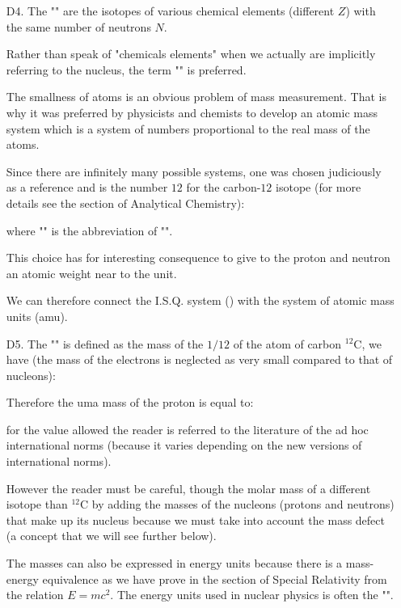 \begin{enumerate}
		\item[D4.] The "" are the isotopes of various chemical elements (different $Z$) with the same number of neutrons $N$.
		
		 Rather than speak of "chemicals elements" when we actually are implicitly referring to the nucleus, the term "" is preferred.
		 
		 The smallness of atoms is an obvious problem of mass measurement. That is why it was preferred by physicists and chemists to develop an atomic mass system which is a system of numbers proportional to the real mass of the atoms.
		 
		 Since there are infinitely many possible systems, one was chosen judiciously as a reference and is the number $12$ for the carbon-$12$ isotope (for more details see the section of Analytical Chemistry):
		 
		where "" is the abbreviation of "".
		
		This choice has for interesting consequence to give to the proton and neutron an atomic weight near to the unit.
		
		We can therefore connect the I.S.Q. system () with the system of atomic mass units (amu).
		
		\item[D5.] The "\label{atomic mass unit}" is defined as the mass of the $1/12$ of the atom of carbon ${}^{12}\mathrm{C}$, we have (the mass of the electrons is neglected as very small compared to that of nucleons):
		
		Therefore the uma mass of the proton is equal to:
		
		 for the value allowed the reader is referred to the literature of the ad hoc international norms (because it varies depending on the new versions of international norms).
		 
		However the reader must be careful, though the molar mass of a different isotope than ${}^{12}\mathrm{C}$ by adding the masses of the nucleons (protons and neutrons) that make up its nucleus because we must take into account the mass defect (a concept that we will see further below).
	
		The masses can also be expressed in energy units because there is a mass-energy equivalence as we have prove in the section of Special Relativity from the relation $E=mc^2$. The energy units used in nuclear physics is often the "".
	

\end{enumerate}
